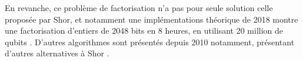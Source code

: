En revanche, ce problème de factorisation n'a pas pour seule solution celle proposée par Shor, et notamment une implémentations théorique de 2018 montre une factorisation d'entiers de 2048 bits en 8 heures, en utilisant 20 million de qubits \cite{gidney2019factor}. D'autres algorithmes sont présentés depuis 2010 notamment, présentant d'autres alternatives à Shor \cite{anschuetz2018variational}.